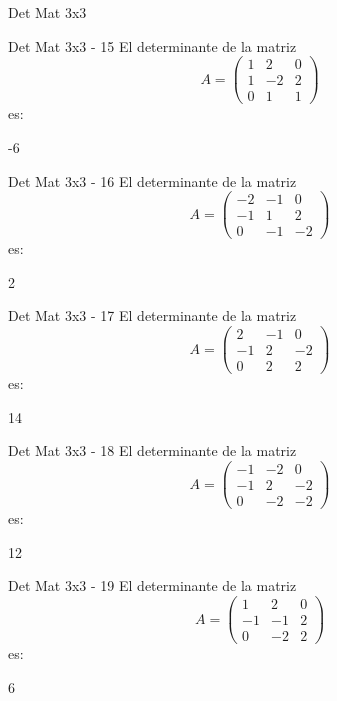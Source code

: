 \documentclass[a4,11pt]{aleph-notas}
\begin{document}
\begin{quiz}{Det Mat 3x3}
\begin{numerical}[tolerance=0]%
    {Det Mat 3x3 - 15}
    El determinante de la matriz
    \[
        A = \begin{pmatrix} 1 & 2 & 0 \\ 1 & -2 & 2 \\ 0 & 1 & 1 \end{pmatrix}
    \]
    es:
    \item[] -6
\end{numerical}

\begin{numerical}[tolerance=0]%
    {Det Mat 3x3 - 16}
    El determinante de la matriz
    \[
        A = \begin{pmatrix} -2 & -1 & 0 \\ -1 & 1 & 2 \\ 0 & -1 & -2 \end{pmatrix}
    \]
    es:
    \item[] 2
\end{numerical}

\begin{numerical}[tolerance=0]%
    {Det Mat 3x3 - 17}
    El determinante de la matriz
    \[
        A = \begin{pmatrix} 2 & -1 & 0 \\ -1 & 2 & -2 \\ 0 & 2 & 2 \end{pmatrix}
    \]
    es:
    \item[] 14
\end{numerical}

\begin{numerical}[tolerance=0]%
    {Det Mat 3x3 - 18}
    El determinante de la matriz
    \[
        A = \begin{pmatrix} -1 & -2 & 0 \\ -1 & 2 & -2 \\ 0 & -2 & -2 \end{pmatrix}
    \]
    es:
    \item[] 12
\end{numerical}

\begin{numerical}[tolerance=0]%
    {Det Mat 3x3 - 19}
    El determinante de la matriz
    \[
        A = \begin{pmatrix} 1 & 2 & 0 \\ -1 & -1 & 2 \\ 0 & -2 & 2 \end{pmatrix}
    \]
    es:
    \item[] 6
\end{numerical}


\end{quiz}
\end{document}
